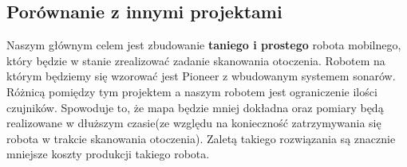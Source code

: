 \subsection{Porównanie z innymi projektami}
Naszym głównym celem jest zbudowanie \textbf{taniego i prostego} robota mobilnego, który będzie w stanie zrealizować zadanie skanowania otoczenia. Robotem na którym będziemy się wzorować jest Pioneer z wbudowanym systemem sonarów. Różnicą pomiędzy tym projektem a naszym robotem jest ograniczenie ilości czujników. Spowoduje to, że mapa będzie mniej dokładna oraz pomiary będą realizowane w dłuższym czasie(ze względu na konieczność zatrzymywania się robota w trakcie skanowania otoczenia). Zaletą takiego rozwiązania są znacznie mniejsze koszty produkcji takiego robota.
